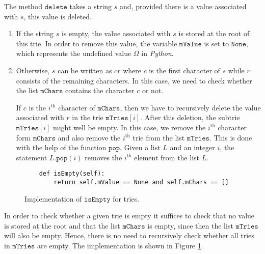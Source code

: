 The method $\texttt{delete}$ takes a string $s$ and, provided there is a value associated with $s$, this
value is deleted.
\begin{enumerate}
\item If the string $s$ is empty, the value associated with $s$ is stored at the root of this trie.
      In order to remove this value, the variable $\texttt{mValue}$ is set to $\texttt{None}$, which represents
      the undefined value $\Omega$ in \textsl{Python}.
\item Otherwise, $s$ can be written as $cr$ where $c$ is the first character of $s$ while $r$
      consists of the remaining characters.  In this case, we need to check whether the list
      $\texttt{mChars}$ contains the character $c$ or not.
 
      If $c$ is the $i^\textrm{th}$ character of $\texttt{mChars}$, then we have to recursively
      delete the value associated with $r$ in the trie $\texttt{mTries}[i]$.  
      After this deletion, the subtrie  $\texttt{mTries}[i]$ might well be empty.  In this case,
      we remove the $i^\textrm{th}$ character form $\texttt{mChars}$ and also remove the $i^\textrm{th}$ trie from the list
      $\texttt{mTries}$.  This is done with the help of the function $\texttt{pop}$.
      Given a list $L$ and an integer $i$, the statement $L.\texttt{pop}(i)$ removes the $i^\textrm{th}$ element from
      the list $L$.
\end{enumerate}

\begin{figure}[!ht]
\centering
\begin{verbatim}
    def isEmpty(self):
        return self.mValue == None and self.mChars == []
\end{verbatim}
\vspace*{-0.3cm}
\caption{Implementation of $\texttt{isEmpty}$ for tries.}
\label{fig:trie.ipython-isEmpty}
\end{figure}

In order to check whether a given trie is empty it suffices to check that no value is stored at the root
and that the list $\texttt{mChars}$ is empty, since then the list $\texttt{mTries}$ will also be empty.  Hence,
there is no need to recursively check whether all tries in $\texttt{mTries}$ are empty.  
The implementation is shown in Figure \ref{fig:trie.ipython-isEmpty}.

